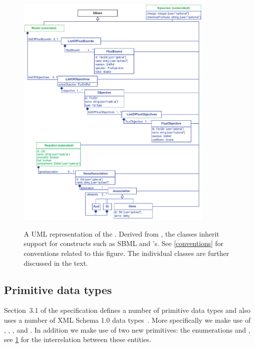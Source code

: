 \begin{figure}[h!]
  \centering
  \includegraphics[width=0.85\textwidth]{images/fbc_uml_v2.pdf}\\
  \caption{A UML representation of the \FBCPackage. Derived from \SBase, the \FBC classes inherit support for constructs such as SBML \Notes and \Annotation's. See \ref{conventions} for conventions related to this figure. The individual classes are further discussed in the text.}
  \label{fig:fbc_uml}
\end{figure}

\subsection{Primitive data types}
\label{primtypes}

Section~3.1 of the \sbmlthreecore specification defines a number of primitive data types and also uses a number of XML Schema 1.0 data types~\citep{biron:2000}. More specifically we make use of , , ,  and . In addition we make use of two new primitives: the enumerations  and , see \ref{fig:fbc_uml} for the interrelation between these entities.

